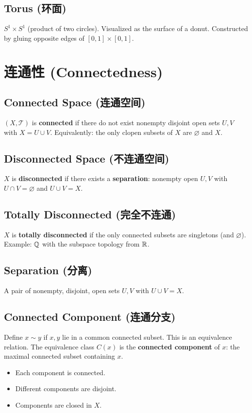 \documentclass{article}
\begin{document}
\subsection{Torus (环面)}\label{def:torus}
$S^1 \times S^1$ (product of two circles). Visualized as the surface
of a donut. Constructed by gluing opposite edges of $[0,1] \times
[0,1]$.

\section{连通性 (Connectedness)}

\subsection{Connected Space (连通空间)}\label{def:connected}
\begin{definition}
  $(X, \mathcal{T})$ is \textbf{connected} if there do not exist
  nonempty disjoint open sets $U, V$ with $X = U \cup V$.
  Equivalently: the only clopen subsets of $X$ are $\varnothing$ and $X$.
\end{definition}

\subsection{Disconnected Space (不连通空间)}\label{def:disconnected}
$X$ is \textbf{disconnected} if there exists a \textbf{separation}:
nonempty open $U, V$ with $U \cap V = \varnothing$ and $U \cup V = X$.

\subsection{Totally Disconnected (完全不连通)}\label{def:totally-disc}
$X$ is \textbf{totally disconnected} if the only connected subsets
are singletons (and $\varnothing$).
Example: $\mathbb{Q}$ with the subspace topology from $\mathbb{R}$.

\subsection{Separation (分离)}\label{def:separation-conn}
A pair of nonempty, disjoint, open sets $U, V$ with $U \cup V = X$.

\subsection{Connected Component (连通分支)}\label{def:component}
Define $x \sim y$ if $x, y$ lie in a common connected subset. This is
an equivalence relation.
The equivalence class $C(x)$ is the \textbf{connected component} of
$x$: the maximal connected subset containing $x$.
\begin{itemize}
  \item Each component is connected.
  \item Different components are disjoint.
  \item Components are closed in $X$.
\end{itemize}
\end{document}

